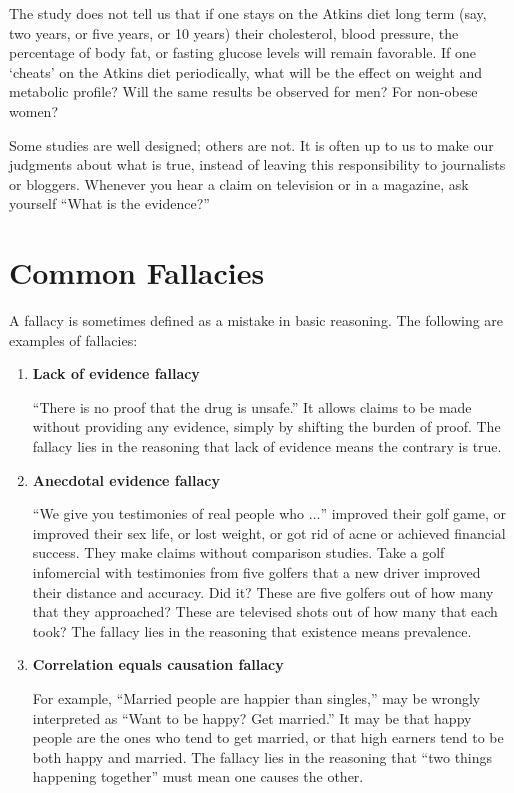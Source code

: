\documentclass[11pt, chapterprefix=true]{scrbook}\usepackage[]{graphicx}\usepackage[]{color}
\begin{document}
The study does not tell us that if one stays on the Atkins diet long term (say, two years, or five years, or 10 years) their cholesterol, blood pressure, the percentage of body fat, or fasting glucose levels will remain favorable.  If one ‘cheats’ on the Atkins diet periodically, what will be the effect on weight and metabolic profile?  Will the same results be observed for men?  For non-obese women?

Some studies are well designed; others are not.  It is often up to us to make our judgments about what is true, instead of leaving this responsibility to journalists or bloggers.  Whenever you hear a claim on television or in a magazine, ask yourself ``What is the evidence?''

\section{Common Fallacies}

A fallacy is sometimes defined as a mistake in basic reasoning. The following are examples of fallacies:

\begin{enumerate}
\item \textbf{Lack of evidence fallacy}

``There is no proof that the drug is unsafe.''  It allows claims to be made without providing any evidence, simply by shifting the burden of proof.  The fallacy lies in the reasoning that lack of evidence means the contrary is true.

\item \textbf{Anecdotal evidence fallacy}

``We give you testimonies of real people who $\dots$'' improved their golf game, or improved their sex life, or lost weight, or got rid of acne or achieved financial success.  They make claims without comparison studies.  Take a golf infomercial with testimonies from five golfers that a new driver improved their distance and accuracy.  Did it?  These are five golfers out of how many that they approached?  These are televised shots out of how many that each took?  The fallacy lies in the reasoning that existence means prevalence.

\item \textbf{Correlation equals causation fallacy}

For example, ``Married people are happier than singles,''  may be wrongly interpreted as ``Want to be happy? Get married.''  It may be that happy people are the ones who tend to get married, or that high earners tend to be both happy and married.  The fallacy lies in the reasoning that ``two things happening together'' must mean one causes the other.
\end{enumerate}
\end{document}
